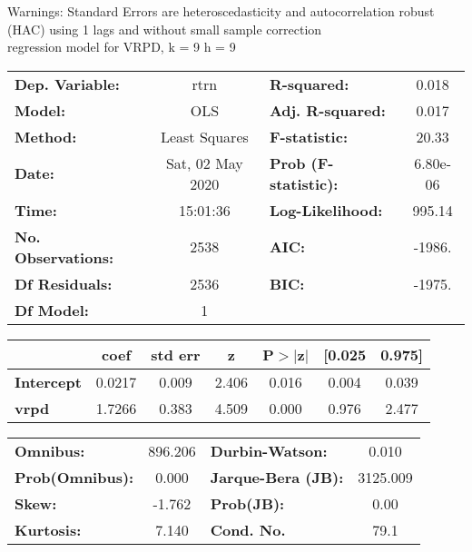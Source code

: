 Warnings: \newline
 [1] Standard Errors are heteroscedasticity and autocorrelation robust (HAC) using 1 lags and without small sample correction\\ 

regression model for VRPD, k = 9 h = 9\begin{center}
\begin{tabular}{lclc}
\toprule
\textbf{Dep. Variable:}    &       rtrn       & \textbf{  R-squared:         } &     0.018   \\
\textbf{Model:}            &       OLS        & \textbf{  Adj. R-squared:    } &     0.017   \\
\textbf{Method:}           &  Least Squares   & \textbf{  F-statistic:       } &     20.33   \\
\textbf{Date:}             & Sat, 02 May 2020 & \textbf{  Prob (F-statistic):} &  6.80e-06   \\
\textbf{Time:}             &     15:01:36     & \textbf{  Log-Likelihood:    } &    995.14   \\
\textbf{No. Observations:} &        2538      & \textbf{  AIC:               } &    -1986.   \\
\textbf{Df Residuals:}     &        2536      & \textbf{  BIC:               } &    -1975.   \\
\textbf{Df Model:}         &           1      & \textbf{                     } &             \\
\bottomrule
\end{tabular}
\begin{tabular}{lcccccc}
                   & \textbf{coef} & \textbf{std err} & \textbf{z} & \textbf{P$> |$z$|$} & \textbf{[0.025} & \textbf{0.975]}  \\
\midrule
\textbf{Intercept} &       0.0217  &        0.009     &     2.406  &         0.016        &        0.004    &        0.039     \\
\textbf{vrpd}      &       1.7266  &        0.383     &     4.509  &         0.000        &        0.976    &        2.477     \\
\bottomrule
\end{tabular}
\begin{tabular}{lclc}
\textbf{Omnibus:}       & 896.206 & \textbf{  Durbin-Watson:     } &    0.010  \\
\textbf{Prob(Omnibus):} &   0.000 & \textbf{  Jarque-Bera (JB):  } & 3125.009  \\
\textbf{Skew:}          &  -1.762 & \textbf{  Prob(JB):          } &     0.00  \\
\textbf{Kurtosis:}      &   7.140 & \textbf{  Cond. No.          } &     79.1  \\
\bottomrule
\end{tabular}
\end{center}

